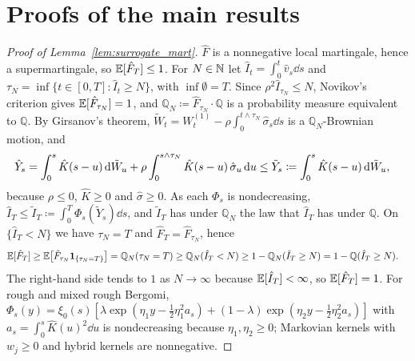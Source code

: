 \section{Proofs of the main results}
\label{app:proofs}

\begin{proof}[Proof of Lemma~\ref{lem:surrogate_mart}]
$\hat{F}$ is a nonnegative local martingale, hence a supermartingale, so $\mathbb{E}[\hat{F}_T]\le1$. For $N\in\mathbb{N}$ let $\hat{I}_t=\int_0^t\hat{v}_s\dd s$ and $\tau_N=\inf\{t\in[0,T]:\hat{I}_t\ge N\}$, with $\inf\emptyset=T$. Since $\rho^2\hat{I}_{\tau_N}\le N$, Novikov's criterion gives $\mathbb{E}[\hat{F}_{\tau_N}]=1$, and $\mathbb{Q}_N\coloneqq\hat{F}_{\tau_N}\cdot\mathbb{Q}$ is a probability measure equivalent to $\mathbb{Q}$. By Girsanov's theorem, $\tilde{W}_t=W_t^{(1)}-\rho\int_0^{t\wedge\tau_N}\hat{\sigma}_s\dd s$ is a $\mathbb{Q}_N$-Brownian motion, and
\[
  \begin{aligned}
  \hat{Y}_s&=\int_0^s\hat{K}(s-u)\,\mathrm{d}\tilde{W}_u+\rho\int_0^{s\wedge\tau_N}\hat{K}(s-u)\,\hat{\sigma}_u\,\mathrm{d} u  \le\tilde{Y}_s\coloneqq\int_0^s\hat{K}(s-u)\,\mathrm{d}\tilde{W}_u,
  \end{aligned}
\]
because $\rho\le0$, $\hat{K}\ge0$ and $\hat{\sigma}\ge0$. As each $\Phi_s$ is nondecreasing, $\hat{I}_T\le\tilde{I}_T\coloneqq\int_0^T\Phi_s(\tilde{Y}_s)\dd s$, and $\tilde{I}_T$ has under $\mathbb{Q}_N$ the law that $\hat{I}_T$ has under $\mathbb{Q}$. On $\{\hat{I}_T<N\}$ we have $\tau_N=T$ and $\hat{F}_T=\hat{F}_{\tau_N}$, hence
\[
  \begin{aligned}
  \mathbb{E}[\hat{F}_T]&\ge\mathbb{E}\bigl[\hat{F}_{\tau_N}\mathbf{1}_{\{\tau_N=T\}}\bigr]=\mathbb{Q}_N(\tau_N=T)  \ge\mathbb{Q}_N(\hat{I}_T<N)\ge1-\mathbb{Q}_N(\tilde{I}_T\ge N)  =1-\mathbb{Q}(\hat{I}_T\ge N).
  \end{aligned}
\]
The right-hand side tends to $1$ as $N\to\infty$ because $\mathbb{E}[\hat{I}_T]<\infty$, so $\mathbb{E}[\hat{F}_T]=1$. For rough and mixed rough Bergomi, $\Phi_s(y)=\xi_0(s)[\lambda\exp(\eta_1y-\tfrac12\eta_1^2a_s)+(1-\lambda)\exp(\eta_2y-\tfrac12\eta_2^2a_s)]$ with $a_s=\int_0^s\hat{K}(u)^2\dd u$ is nondecreasing because $\eta_1,\eta_2\ge0$; Markovian kernels with $w_j\ge0$ and hybrid kernels are nonnegative.
\end{proof}

